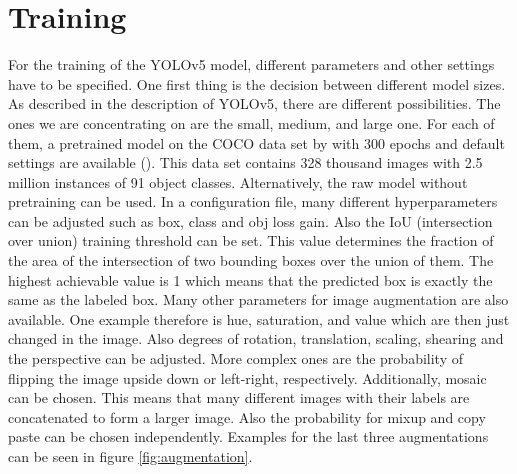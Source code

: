 \section{Training}
For the training of the YOLOv5 model, different parameters and other settings have to be specified. One first thing is the decision between different model sizes. As described in the description of YOLOv5, there are different possibilities. The ones we are concentrating on are the small, medium, and large one. For each of them, a pretrained model on the COCO data set by \cite{COCO} with 300 epochs and default settings are available (\cite{yolov5}). This data set contains 328 thousand images with 2.5 million instances of 91 object classes. Alternatively, the raw model without pretraining can be used. In a configuration file, many different hyperparameters can be adjusted such as box, class and obj loss gain. Also the IoU (intersection over union) training threshold can be set. This value determines the fraction of the area of the intersection of two bounding boxes over the union of them. The highest achievable value is 1 which means that the predicted box is exactly the same as the labeled box. Many other parameters for image augmentation are also available. One example therefore is hue, saturation, and value which are then just changed in the image. Also degrees of rotation, translation, scaling, shearing and the perspective can be adjusted. More complex ones are the probability of flipping the image upside down or left-right, respectively. Additionally, mosaic can be chosen. This means that many different images with their labels are concatenated to form a larger image. Also the probability for mixup and copy paste can be chosen independently. Examples for the last three augmentations can be seen in figure \ref{fig:augmentation}.\\


